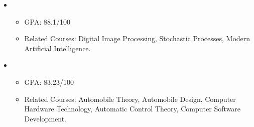   \begin{itemize}[leftmargin=*]
    \item
      {\small
      \begin{itemize}
         \item{GPA: 88.1/100}
         \item{Related Courses: Digital Image Processing, Stochastic Processes, Modern Artificial Intelligence.}
      \end{itemize}
      }
    \item
      {\small
      \begin{itemize}
         \item{GPA: 83.23/100}
	     \item{Related Courses: Automobile Theory, Automobile Design, Computer Hardware Technology, Automatic Control Theory, Computer Software Development.}
      \end{itemize}
      }
  \end{itemize}
